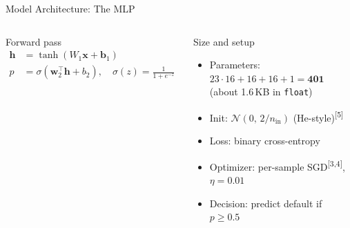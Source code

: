 \documentclass[aspectratio=169]{beamer}
\newcommand{\cit}[1]{\textsuperscript{\textcolor{accent}{[#1]}}}
\begin{document}
\begin{frame}{Model Architecture: The MLP}
\begin{columns}[c]
      \begin{block}{Forward pass}
        \small
        \begin{align*}
          \mathbf{h} &= \tanh(W_1\mathbf{x} + \mathbf{b}_1) \\
          p &= \sigma(\mathbf{w}_2^{\top}\mathbf{h} + b_2), \quad \sigma(z)=\tfrac{1}{1+e^{-z}}
        \end{align*}
      \end{block}
      \begin{block}{Size and setup}
        \footnotesize
        \begin{itemize}
          \item Parameters: $23{\cdot}16 + 16 + 16 + 1 = \mathbf{401}$ (about 1.6\,KB in \texttt{float})
          \item Init: $\mathcal{N}(0,\,2/n_{\text{in}})$ (He-style)\cit{5}
          \item Loss: binary cross-entropy
          \item Optimizer: per-sample SGD\cit{3,4}, $\eta = 0.01$
          \item Decision: predict default if $p \geq 0.5$
        \end{itemize}
      \end{block}
  \end{columns}
\end{frame}
\end{document}
